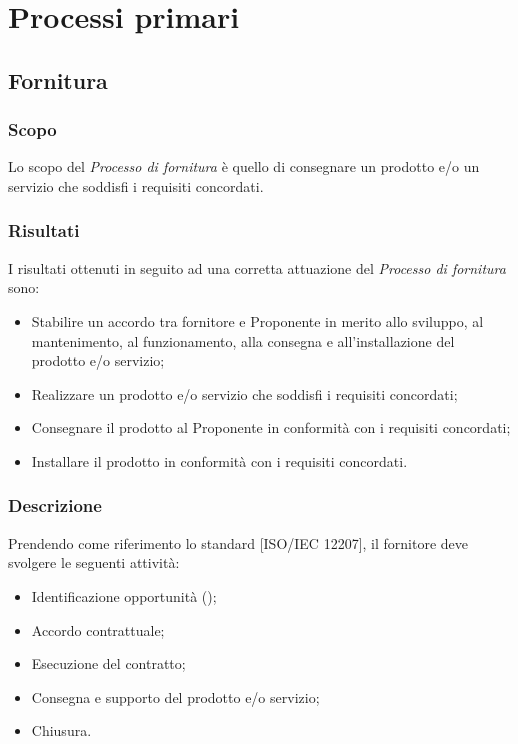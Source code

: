 \documentclass[../NormeDiProgetto.tex]{subfiles}
\begin{document}
	\section{Processi primari}
		\subsection{Fornitura}
			\subsubsection{Scopo}
				Lo scopo del \textit{Processo di fornitura} è quello di consegnare un prodotto e/o un
				servizio che soddisfi i requisiti concordati.
			\subsubsection{Risultati}
				I risultati ottenuti in seguito ad una corretta attuazione del
				\textit{Processo di fornitura} sono:
				\begin{itemize}
					\item Stabilire un accordo tra fornitore e Proponente in merito allo sviluppo, al
					mantenimento, al funzionamento, alla consegna e all'installazione del prodotto
					e/o servizio;
					\item Realizzare un prodotto e/o servizio che soddisfi i requisiti concordati;
					\item Consegnare il prodotto al Proponente in conformità con i requisiti
					concordati;
					\item Installare il prodotto in conformità con i requisiti concordati.
				\end{itemize}
			\subsubsection{Descrizione}
				Prendendo come riferimento lo standard [ISO/IEC 12207], il fornitore deve svolgere le seguenti
				attività:
				\begin{itemize}
					\item Identificazione opportunità (\studiodifattibilita);
					\item Accordo contrattuale;
					\item Esecuzione del contratto;
					\item Consegna e supporto del prodotto e/o servizio;
					\item Chiusura.
				\end{itemize}
\end{document}
